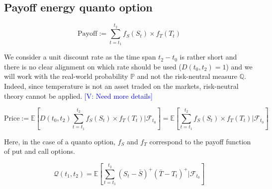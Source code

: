 \documentclass[10pt,a4paper,reqno]{amsart}
\theoremstyle{example}
\newcommand{\vincent}[1]{\textcolor{blue}{[V: #1]}}
\begin{document}
\subsection{Payoff energy quanto option}
$$
\displaystyle\text{Payoff}:=\sum_{t=t_1}^{t_2}f_S(S_t)\times f_T(T_t)
$$

We consider a unit discount rate as the time span $t_2-t_0$ is rather short and there is no clear alignment on which rate should be used ($D(t_0,t_2)=1$) and we will work with the real-world probability $\mathbb{P}$ and not the risk-neutral measure $\mathbb{Q}$. Indeed, since temperature is not an asset traded on the markets, risk-neutral theory cannot be applied. \vincent{Need more details}

$$
\displaystyle\text{Price}:=\mathbb{E}\left[D(t_0,t_2)\sum_{t=t_1}^{t_2}f_S(S_t)\times f_T(T_t) \bigg| \mathcal{F}_{t_0}\right]=\mathbb{E}\left[\sum_{t=t_1}^{t_2}f_S(S_t)\times f_T(T_t) \bigg| \mathcal{F}_{t_0}\right]
$$

Here, in the case of a quanto option, $f_S$ and $f_T$ correspond to the payoff function of put and call options.

$$
\displaystyle\mathcal{Q}(t_1,t_2)=\mathbb{E}\left[\sum_{t=t_1}^{t_2}(S_t-\bar{S})^+(\bar{T}-T_t)^+ \bigg| \mathcal{F}_{t_0}\right]
$$
\end{document}
